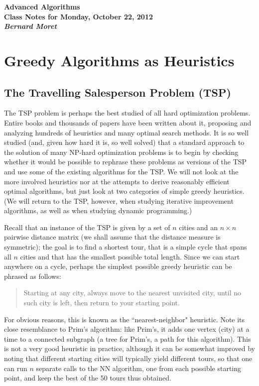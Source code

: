 \documentclass[11pt]{article}
\begin{document}
\begin{center}
  \LARGE\bf Advanced Algorithms\\

  \Large\sf
  Class Notes for Monday, October 22, 2012\\

  \it
  Bernard Moret
\end{center}

\bigskip

\section{Greedy Algorithms as Heuristics}

\subsection{The Travelling Salesperson Problem (TSP)}
The TSP problem is perhaps the best studied of all hard optimization
problems.  Entire books and thousands of papers have been written about
it, proposing and analyzing hundreds of heuristics and many optimal
search methods.  It is so well studied (and, given how hard it is,
so well solved) that a standard approach to the solution of many NP-hard
optimization problems is to begin by checking whether it would be possible
to rephrase these problems as versions of the TSP and use some of the existing
algorithms for the TSP.   We will not look at the more involved heuristics
nor at the attempts to derive reasonably efficient optimal algorithms, but
just look at two categories of simple greedy heuristics.  (We will return
to the TSP, however, when studying iterative improvement algorithms, as well
as when studying dynamic programming.)

Recall that an instance of the TSP is given by a set of $n$ cities and
an $n\times n$ pairwise distance matrix (we shall assume that the distance
measure is symmetric); the goal is to find a shortest
tour, that is a simple cycle that spans all $n$ cities and that has the
smallest possible total length.  Since we can start anywhere on a cycle,
perhaps the simplest possible greedy heuristic can be phrased as follows:
\begin{quote}
  Starting at any city, always move to the nearest unvisited city,
  until no such city is left, then return to your starting point.
\end{quote}
For obvious reasons, this is known as the ``nearest-neighbor" heuristic.
Note its close resemblance to Prim's algorithm: like Prim's, it adds one
vertex (city) at a time to a connected subgraph (a tree for Prim's, a
path for this algorithm).  This is not a very good heuristic in practice,
although it can be somewhat improved by noting that different starting
cities will typically yield different tours, so that one can run $n$
separate calls to the NN algorithm, one from each possible starting point,
and keep the best of the 50 tours thus obtained.
\end{document}
